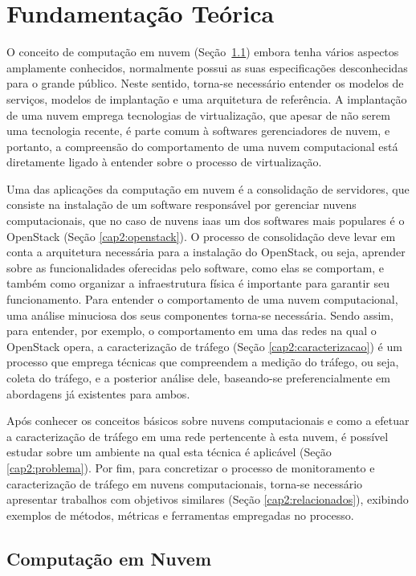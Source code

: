 \chapter{Fundamentação Teórica}
\label{cap2}

O conceito de computação em nuvem (Seção~\ref{cap2:nuvem}) embora tenha vários aspectos amplamente conhecidos, normalmente possui as suas especificações desconhecidas para o grande público. 
%
Neste sentido, torna-se necessário entender os modelos de serviços, modelos de implantação e uma arquitetura de referência.
%
A implantação de uma nuvem emprega tecnologias de virtualização, que apesar de não serem uma tecnologia recente, é parte comum à softwares gerenciadores de nuvem, e portanto, a compreensão do comportamento de uma nuvem computacional está diretamente ligado à entender sobre o processo de virtualização.

Uma das aplicações da computação em nuvem é a consolidação de servidores, que consiste na instalação de um software responsável por gerenciar nuvens computacionais, que no caso de nuvens \ac{iaas} um dos softwares mais populares é o OpenStack (Seção \ref{cap2:openstack}).
%
O processo de consolidação deve levar em conta a arquitetura necessária para a instalação do OpenStack, ou seja, aprender sobre as funcionalidades oferecidas pelo software, como elas se comportam, e também como organizar a infraestrutura física é importante para garantir seu funcionamento.
%
Para entender o comportamento de uma nuvem computacional, uma análise minuciosa dos seus componentes torna-se necessária.
%
Sendo assim, para entender, por exemplo, o comportamento em uma das redes na qual o OpenStack opera, a caracterização de tráfego (Seção \ref{cap2:caracterizacao}) é um processo que emprega técnicas que compreendem a medição do tráfego, ou seja, coleta do tráfego, e a posterior análise dele, baseando-se preferencialmente em abordagens já existentes para ambos.

Após conhecer os conceitos básicos sobre nuvens computacionais e como a efetuar a caracterização de tráfego em uma rede pertencente à esta nuvem, é possível estudar sobre um ambiente na qual esta técnica é aplicável (Seção \ref{cap2:problema}).
%
Por fim, para concretizar o processo de monitoramento e caracterização de tráfego em nuvens computacionais, torna-se necessário apresentar trabalhos com objetivos similares (Seção \ref{cap2:relacionados}), exibindo exemplos de métodos, métricas e ferramentas empregadas no processo.

\section{Computação em Nuvem}
\label{cap2:nuvem}

